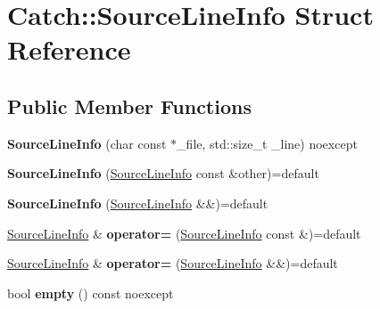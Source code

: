 \hypertarget{structCatch_1_1SourceLineInfo}{}\section{Catch\+:\+:Source\+Line\+Info Struct Reference}
\label{structCatch_1_1SourceLineInfo}
\subsection*{Public Member Functions}
\begin{DoxyCompactItemize}
\item 
{\bfseries Source\+Line\+Info} (char const $\ast$\+\_\+file, std\+::size\+\_\+t \+\_\+line) noexcept\hypertarget{structCatch_1_1SourceLineInfo_a48510b82a39a042ab370ed143dd30c10}{}\label{structCatch_1_1SourceLineInfo_a48510b82a39a042ab370ed143dd30c10}

\item 
{\bfseries Source\+Line\+Info} (\hyperlink{structCatch_1_1SourceLineInfo}{Source\+Line\+Info} const \&other)=default\hypertarget{structCatch_1_1SourceLineInfo_a7c44c9986c33a9cf842b791374332d41}{}\label{structCatch_1_1SourceLineInfo_a7c44c9986c33a9cf842b791374332d41}

\item 
{\bfseries Source\+Line\+Info} (\hyperlink{structCatch_1_1SourceLineInfo}{Source\+Line\+Info} \&\&)=default\hypertarget{structCatch_1_1SourceLineInfo_a6614b503b493bbdd3b49a1bd732e0a55}{}\label{structCatch_1_1SourceLineInfo_a6614b503b493bbdd3b49a1bd732e0a55}

\item 
\hyperlink{structCatch_1_1SourceLineInfo}{Source\+Line\+Info} \& {\bfseries operator=} (\hyperlink{structCatch_1_1SourceLineInfo}{Source\+Line\+Info} const \&)=default\hypertarget{structCatch_1_1SourceLineInfo_a1a6cfc0197357ef4e329bb256aa8a354}{}\label{structCatch_1_1SourceLineInfo_a1a6cfc0197357ef4e329bb256aa8a354}

\item 
\hyperlink{structCatch_1_1SourceLineInfo}{Source\+Line\+Info} \& {\bfseries operator=} (\hyperlink{structCatch_1_1SourceLineInfo}{Source\+Line\+Info} \&\&)=default\hypertarget{structCatch_1_1SourceLineInfo_a7fa35372f2bca5e91adc25327b7c753c}{}\label{structCatch_1_1SourceLineInfo_a7fa35372f2bca5e91adc25327b7c753c}

\item 
bool {\bfseries empty} () const noexcept\hypertarget{structCatch_1_1SourceLineInfo_a10a5b5b7dff82971879c2eb8d83f9b3b}{}\label{structCatch_1_1SourceLineInfo_a10a5b5b7dff82971879c2eb8d83f9b3b}


\end{DoxyCompactItemize}
